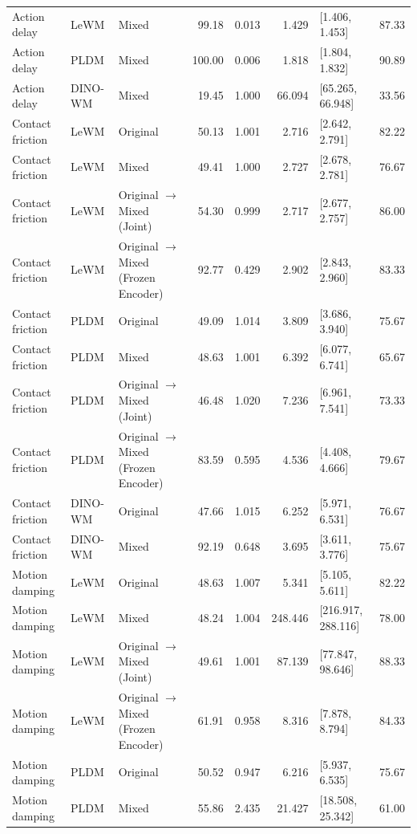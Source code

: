 \begin{longtable}{@{}p{1.8cm}lp{3.65cm}rrrp{2.5cm}r@{}}
\midrule
Action delay & LeWM & Mixed & 99.18 & 0.013 & 1.429 & [1.406, 1.453] & 87.33 \\
Action delay & PLDM & Mixed & 100.00 & 0.006 & 1.818 & [1.804, 1.832] & 90.89 \\
Action delay & DINO-WM & Mixed & 19.45 & 1.000 & 66.094 & [65.265, 66.948] & 33.56 \\
\midrule
Contact friction & LeWM & Original & 50.13 & 1.001 & 2.716 & [2.642, 2.791] & 82.22 \\
Contact friction & LeWM & Mixed & 49.41 & 1.000 & 2.727 & [2.678, 2.781] & 76.67 \\
Contact friction & LeWM & Original $\rightarrow$ Mixed (Joint) & 54.30 & 0.999 & 2.717 & [2.677, 2.757] & 86.00 \\
Contact friction & LeWM & Original $\rightarrow$ Mixed (Frozen Encoder) & 92.77 & 0.429 & 2.902 & [2.843, 2.960] & 83.33 \\
Contact friction & PLDM & Original & 49.09 & 1.014 & 3.809 & [3.686, 3.940] & 75.67 \\
Contact friction & PLDM & Mixed & 48.63 & 1.001 & 6.392 & [6.077, 6.741] & 65.67 \\
Contact friction & PLDM & Original $\rightarrow$ Mixed (Joint) & 46.48 & 1.020 & 7.236 & [6.961, 7.541] & 73.33 \\
Contact friction & PLDM & Original $\rightarrow$ Mixed (Frozen Encoder) & 83.59 & 0.595 & 4.536 & [4.408, 4.666] & 79.67 \\
Contact friction & DINO-WM & Original & 47.66 & 1.015 & 6.252 & [5.971, 6.531] & 76.67 \\
Contact friction & DINO-WM & Mixed & 92.19 & 0.648 & 3.695 & [3.611, 3.776] & 75.67 \\
\midrule
Motion damping & LeWM & Original & 48.63 & 1.007 & 5.341 & [5.105, 5.611] & 82.22 \\
Motion damping & LeWM & Mixed & 48.24 & 1.004 & 248.446 & [216.917, 288.116] & 78.00 \\
Motion damping & LeWM & Original $\rightarrow$ Mixed (Joint) & 49.61 & 1.001 & 87.139 & [77.847, 98.646] & 88.33 \\
Motion damping & LeWM & Original $\rightarrow$ Mixed (Frozen Encoder) & 61.91 & 0.958 & 8.316 & [7.878, 8.794] & 84.33 \\
Motion damping & PLDM & Original & 50.52 & 0.947 & 6.216 & [5.937, 6.535] & 75.67 \\
Motion damping & PLDM & Mixed & 55.86 & 2.435 & 21.427 & [18.508, 25.342] & 61.00 \\

\end{longtable}
